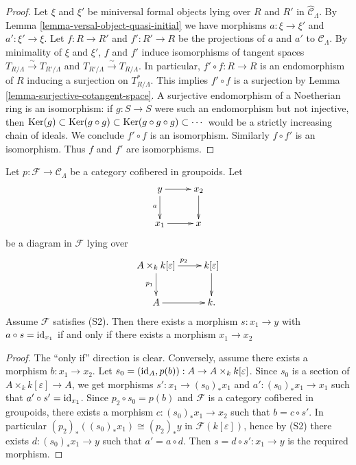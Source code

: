 \begin{proof}
Let $\xi$ and $\xi'$ be miniversal formal objects lying over $R$ and $R'$ in 
$\widehat{\mathcal C}_{\Lambda}$.  By
Lemma \ref{lemma-versal-object-quasi-initial}
we have morphisms $a: \xi \rightarrow 
\xi'$ and $a': \xi' \rightarrow \xi$.  Let $f:R \rightarrow R'$ and $f': R' 
\rightarrow R$ be the projections of $a$ and $a'$ to $\mathcal C_{\Lambda}$.  
By minimality of $\xi$ and $\xi'$, $f$ and $f'$ induce isomorphisms of tangent 
spaces $T_{R/\Lambda} \xrightarrow{\sim} T_{R'/\Lambda}$ and $T_{R'/\Lambda} 
\xrightarrow{\sim} T_{R/\Lambda}$.  In particular, $f' \circ f: R \rightarrow 
R$ is an endomorphism of $R$ inducing a surjection on $T^*_{R/\Lambda}$. This 
implies $f' \circ f$ is a surjection by Lemma 
\ref{lemma-surjective-cotangent-space}. A surjective endomorphism of a 
Noetherian ring is an isomorphism: if $g: S \rightarrow S$ were such an 
endomorphism but not injective, then $\textnormal{Ker}(g) \subset 
\textnormal{Ker}(g \circ g) \subset \textnormal{Ker}(g \circ g \circ g) \subset 
\cdots$ would be a strictly increasing chain of ideals.  We conclude $f' \circ 
f$ is an isomorphism.  Similarly $f \circ f'$ is an isomorphism.  Thus $f$ and 
$f'$ are isomorphisms.
\end{proof}

\begin{lemma}
\label{lemma-lifting-section}
Let $p: \mathcal F \rightarrow \mathcal C_{\Lambda}$ be a category cofibered in 
groupoids.  Let 
\[
\xymatrix{
y \ar[r] \ar[d]_{a} & x_2 \ar[d] \\
x_1 \ar[r]        & x
}
\]
be a diagram in $\mathcal F$ lying over
\[
\xymatrix{
A \times_{k} k[\varepsilon] \ar[r]^{p_2} \ar[d]_{p_1} & k[\varepsilon] \ar[d] \\
A \ar[r] & k.
}
\]
Assume $\mathcal F$ satisfies \textnormal{(S2)}. Then there exists a morphism 
$s: x_1 \rightarrow y$ with $a \circ s = \textnormal{id}_{x_1}$ if and only if 
there exists a morphism $x_1 \rightarrow x_2$
\end{lemma}

\begin{proof}
The ``only if'' direction is clear.  Conversely, assume there exists a morphism 
$b: x_1 \rightarrow x_2$.  Let $s_0 = (\textnormal{id}_A, p(b)): A \rightarrow 
A \times_{k} k[\varepsilon]$.  Since $s_0$ is a section of $A \times_{k} 
k[\varepsilon] \rightarrow A$, we get morphisms $s': x_1 \rightarrow 
(s_0)_*x_1$ and $a': (s_0)_*x_1 \rightarrow x_1$ such that $a' \circ s' = 
\textnormal{id}_{x_1}$.  Since $p_2 \circ s_0 = p(b)$ and $\mathcal F$ is a 
category cofibered in groupoids, there exists a morphism $c: (s_0)_*x_1 
\rightarrow x_2$ such that $b = c \circ s'$.  In particular 
$(p_2)_*((s_0)_*x_1) \cong (p_2)_*y$ in $\mathcal F(k[\varepsilon])$, hence by 
(S2) there exists $d: (s_0)_*x_1 \rightarrow y$ such that $a' = a \circ d$.  
Then $s = d \circ s': x_1 \rightarrow y$ is the required morphism.
\end{proof}

